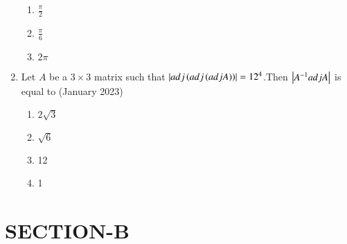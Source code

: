 \documentclass[journal,12pt,onecolumn]{IEEEtran}
\theoremstyle{remark}
\begin{document}
\begin{enumerate}
\begin{enumerate}
    \item $\frac{\pi}{2}$
    \item $\frac{\pi}{6}$
    \item $2\pi$
\end{enumerate}
\item Let $A$ be a $3 \times 3$ matrix such that $\left\vert adj\left(adj\left(adjA\right)\right)\right\vert=12^4$.Then $\left\vert A^{-1}adjA\right\vert$ is equal to 
\hfill{(January 2023)}
\begin{enumerate}
    \item $2\sqrt{3}$
    \item $\sqrt{6}$
    \item 12
    \item 1
\end{enumerate}
\end{enumerate}
\section{SECTION-B}
\end{document}
